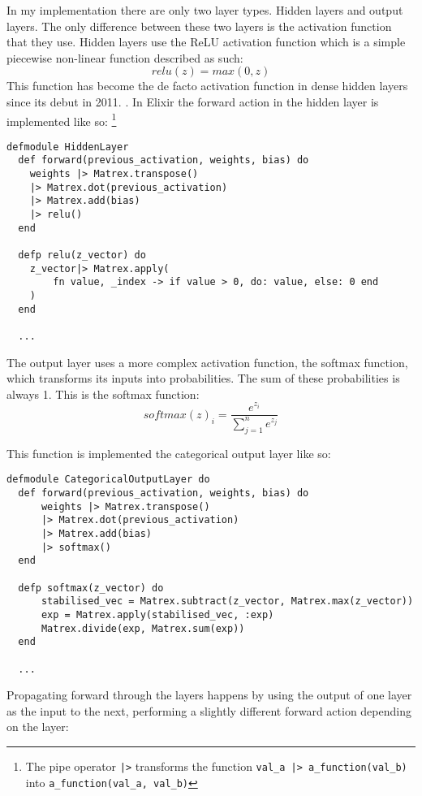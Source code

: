 In my implementation there are only two layer types. Hidden layers and output
layers. The only difference between these two layers is the activation function
that they use. Hidden layers use the ReLU activation function which is a simple
piecewise non-linear function described as such:
\begin{equation}
    relu(z) = max(0,z)
\end{equation}
\clearpage
This function has become the de facto activation function in dense hidden
layers since its debut in 2011. \cite{glorot2011deep}. In Elixir the forward
action in the hidden layer is implemented like so: \footnote{The pipe operator
\lstinline{|>} transforms the function \lstinline{val_a |> a_function(val_b)}
into \lstinline{a_function(val_a, val_b)}}
\begin{lstlisting}
defmodule HiddenLayer
  def forward(previous_activation, weights, bias) do
    weights |> Matrex.transpose()
    |> Matrex.dot(previous_activation)
    |> Matrex.add(bias)
    |> relu()
  end

  defp relu(z_vector) do
    z_vector|> Matrex.apply(
        fn value, _index -> if value > 0, do: value, else: 0 end
    )
  end

  ...
\end{lstlisting}

The output layer uses a more complex activation function, the softmax function,
which transforms its inputs into probabilities. The sum of these probabilities
is always 1. This is the softmax function:
\begin{equation}
    softmax(z)_{i} = \frac{e^{z_{i}}}{\sum_{j=1}^{n} e^{z_{j}}}
\end{equation}

This function is implemented the categorical output layer like so:
\begin{lstlisting}
defmodule CategoricalOutputLayer do
  def forward(previous_activation, weights, bias) do
      weights |> Matrex.transpose()
      |> Matrex.dot(previous_activation)
      |> Matrex.add(bias)
      |> softmax()
  end

  defp softmax(z_vector) do
      stabilised_vec = Matrex.subtract(z_vector, Matrex.max(z_vector))
      exp = Matrex.apply(stabilised_vec, :exp)
      Matrex.divide(exp, Matrex.sum(exp))
  end

  ...
\end{lstlisting}

Propagating forward through the layers happens by using the output of one
layer as the input to the next, performing a slightly different forward action
depending on the layer:

